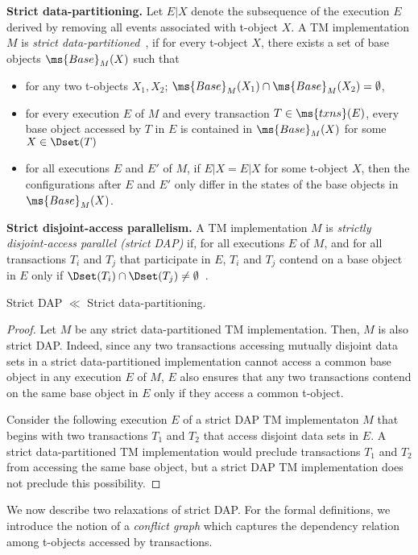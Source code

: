 \vspace{1mm}\noindent\textbf{Strict data-partitioning.}
Let $E|X$ denote the subsequence of the execution $E$ derived by removing all events associated with t-object $X$.
A TM implementation $M$ is \emph{strict data-partitioned}~\cite{tm-book}, if for every t-object $X$, 
there exists a set of base objects $\ms{Base}_M(X)$ such that
\begin{itemize}
\item
for any two t-objects $X_1, X_2$; $\ms{Base}_M(X_1) \cap \ms{Base}_M(X_2)=\emptyset$,
\item 
for every execution $E$ of $M$ and every transaction $T \in \ms{txns}(E)$,
every base object accessed by $T$ in $E$ is contained in $\ms{Base}_M(X)$ for some $X\in \Dset(T)$
\item
for all executions $E$ and $E'$ of $M$, if $E|X=E|X$ for some t-object $X$, then the configurations after $E$ and
$E'$ only differ in the states of the base objects in $\ms{Base}_M(X)$.
\end{itemize}
\vspace{1mm}\noindent\textbf{Strict disjoint-access parallelism.}
A TM implementation $M$ is \emph{strictly disjoint-access parallel
  (strict DAP)} if, for
all executions $E$ of $M$, and for all transactions $T_i$ and $T_j$ that participate in $E$, 
$T_i$ and $T_j$ contend on a base object in $E$ only if 
$\Dset(T_i)\cap \Dset(T_j)\neq \emptyset$~\cite{tm-book}.
\begin{proposition}
Strict DAP $\ll$ Strict data-partitioning.
\end{proposition}
\begin{proof}
Let $M$ be any strict data-partitioned TM implementation. Then, $M$ is also strict DAP. Indeed,
since any two transactions accessing mutually disjoint data sets in a strict data-partitioned implementation
cannot access a common base object in any execution $E$ of $M$, $E$ also ensures that
any two transactions
contend on the same base object in $E$ only if   
they access a common t-object.

Consider the following execution $E$ of a strict DAP TM implementaton $M$ 
that begins with two transactions $T_1$ and $T_2$ that access disjoint data sets in $E$. 
A strict data-partitioned TM implementation
would preclude transactions $T_1$ and $T_2$ from accessing the same base object, but a strict DAP
TM implementation does not preclude this possibility.
\end{proof}
We now describe two relaxations of strict DAP. For the formal definitions, we introduce the notion of a
\emph{conflict graph} which captures the dependency relation among t-objects accessed by transactions.

